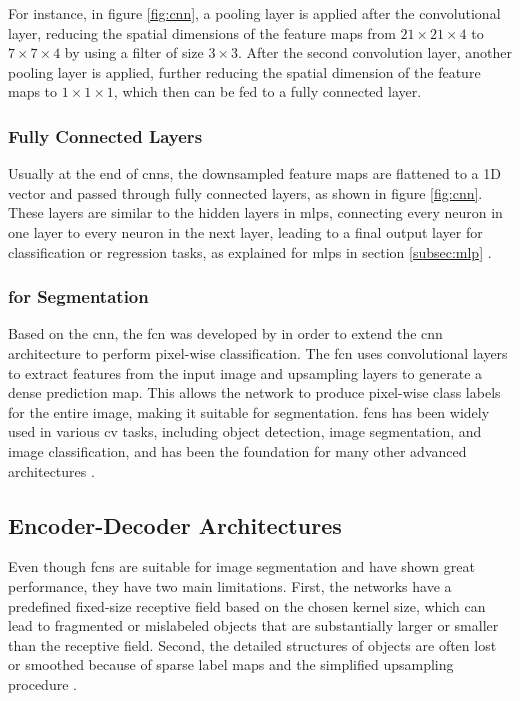 For instance, in figure \ref{fig:cnn}, a pooling layer is applied after the convolutional layer, reducing the spatial dimensions of the feature maps from \( 21 \times 21 \times 4 \) to \( 7 \times 7 \times 4\) by using a filter of size \( 3 \times 3 \). After the second convolution layer, another pooling layer is applied, further reducing the spatial dimension of the feature maps to \( 1 \times 1 \times 1 \), which then can be fed to a fully connected layer.  

\subsubsection*{Fully Connected Layers}

Usually at the end of \glspl{cnn}, the downsampled feature maps are flattened to a 1D vector and passed through fully connected layers, as shown in figure \ref{fig:cnn}. These layers are similar to the hidden layers in \glspl{mlp}, connecting every neuron in one layer to every neuron in the next layer, leading to a final output layer for classification or regression tasks, as explained for \glspl{mlp} in section \ref{subsec:mlp} \autocite{Alzubaidi.Zhang.ea2021}.

\subsubsection*{ for Segmentation}

Based on the \gls{cnn}, the \gls{fcn} was developed by \textcite{Long.Shelhamer.ea2015} in order to extend the \gls{cnn} architecture to perform pixel-wise classification. The \gls{fcn} uses convolutional layers to extract features from the input image and upsampling layers to generate a dense prediction map. This allows the network to produce pixel-wise class labels for the entire image, making it suitable for segmentation. \glspl{fcn} has been widely used in various \gls{cv} tasks, including object detection, image segmentation, and image classification, and has been the foundation for many other advanced architectures \autocite{Long.Shelhamer.ea2015,Minaee.Boykov.ea2022,Noh.Hong.ea2015}.

\subsection{Encoder-Decoder Architectures}

Even though \glspl{fcn} are suitable for image segmentation and have shown great performance, they have two main limitations. First, the networks have a predefined fixed-size receptive field based on the chosen kernel size, which can lead to fragmented or mislabeled objects that are substantially larger or smaller than the receptive field. Second, the detailed structures of objects are often lost or smoothed because of sparse label maps and the simplified upsampling procedure \autocite{Badrinarayanan.Kendall.ea2017,Liu.Yu.ea2018,Noh.Hong.ea2015}.

